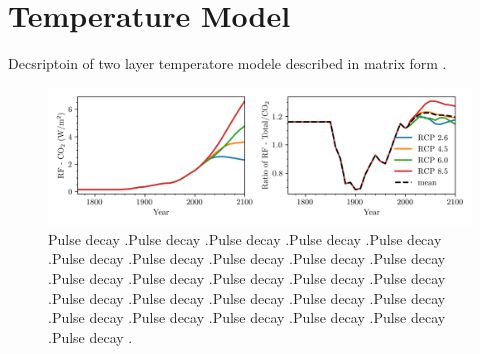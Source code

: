 \documentclass[11pt, a4paper, pdftex, twoside, dvipsnames]{article}
\begin{document}
\section{Temperature Model}
Decsriptoin of two layer temperatore modele described in matrix form .
%
\begin{figure}[b]
	\includegraphics[width=\textwidth]{fig/simulations_RF}

	\caption{
    Pulse decay .Pulse decay .Pulse decay .Pulse decay .Pulse decay .Pulse decay .Pulse decay .Pulse decay .Pulse decay .Pulse decay .Pulse decay .Pulse decay .Pulse decay .Pulse decay .Pulse decay .Pulse decay .Pulse decay .Pulse decay .Pulse decay .Pulse decay .Pulse decay .Pulse decay .Pulse decay .Pulse decay .Pulse decay .Pulse decay .
     }
    \label{fig:6}
\end{figure}



\clearpage

\end{document}
